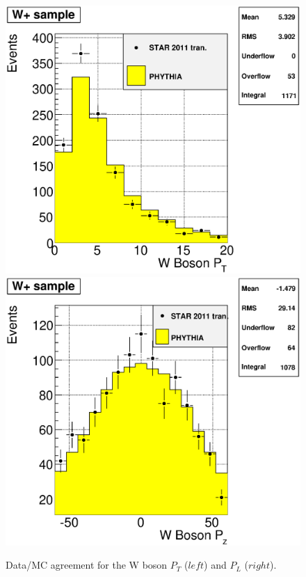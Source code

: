 \documentclass[12pt]{article}
\begin{document}
\begin{figure}[htbp]
\begin{center}
\includegraphics[scale=0.4]{images/DataMC/plot_DataMc_WpPt}
\includegraphics[scale=0.4]{images/DataMC/plot_DataMc_WpPz}
\end{center}
\caption{Data/MC agreement for the W boson $P_{T}$ ($left$) and $P_{L}$ ($right$).}
\label{fig:plot_DataMc_Wp} 
\end{figure}
\end{document}
